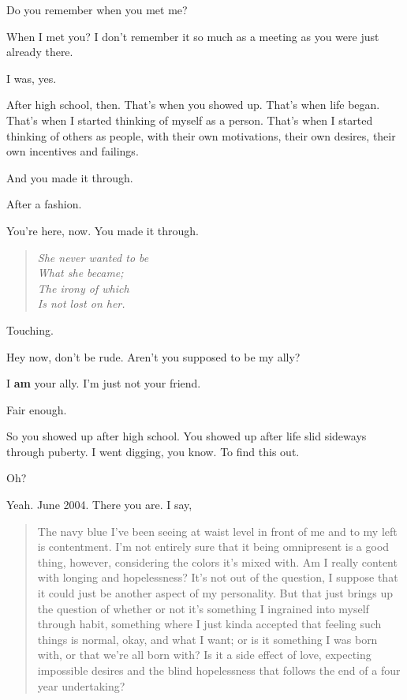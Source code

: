 \begin{ally}
Do you remember when you met me?
\end{ally}
When I met you? I don't remember it so much as a meeting as you were just already there.

\begin{ally}
I was, yes.
\end{ally}
After high school, then. That's when you showed up. That's when life began. That's when I started thinking of myself as a person. That's when I started thinking of others as people, with their own motivations, their own desires, their own incentives and failings.

\begin{ally}
And you made it through.
\end{ally}
After a fashion.

\begin{ally}
You're here, now. You made it through.
\end{ally}
\begin{verse}
\emph{She never wanted to be\\
\vin What she became;\\
\vin \vin The irony of which\\
\vin \vin \vin Is not lost on her.}
\end{verse}

\begin{ally}
Touching.
\end{ally}
Hey now, don't be rude. Aren't you supposed to be my ally?

\begin{ally}
I \textbf{am} your ally. I'm just not your friend.
\end{ally}
Fair enough.

So you showed up after high school. You showed up after life slid sideways through puberty. I went digging, you know. To find this out.

\begin{ally}
Oh?
\end{ally}
Yeah. June 2004. There you are. I say,

\begin{quotation}
The navy blue I've been seeing at waist level in front of me and to my left is contentment. I'm not entirely sure that it being omnipresent is a good thing, however, considering the colors it's mixed with. Am I really content with longing and hopelessness? It's not out of the question, I suppose that it could just be another aspect of my personality. But that just brings up the question of whether or not it's something I ingrained into myself through habit, something where I just kinda accepted that feeling such things is normal, okay, and what I want; or is it something I was born with, or that we're all born with? Is it a side effect of love, expecting impossible desires and the blind hopelessness that follows the end of a four year undertaking?
\end{quotation}

